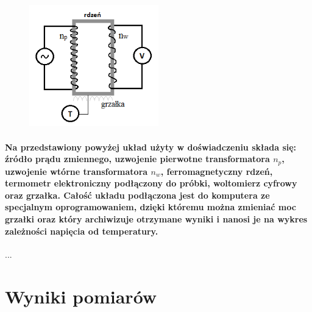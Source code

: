 \documentclass[a4paper,10pt]{article}
\begin{document}
\begin{figure}[H]
\center
\includegraphics[width=0.5\textwidth]{uklad.png}
\end{figure}

\paragraph{Na przedstawiony powyżej układ użyty w doświadczeniu składa się: źródło prądu zmiennego, uzwojenie pierwotne transformatora $n_p$, uzwojenie wtórne transformatora $n_w$, ferromagnetyczny rdzeń, termometr elektroniczny podłączony do próbki, woltomierz cyfrowy oraz grzałka. Całość układu podłączona jest do komputera ze specjalnym oprogramowaniem, dzięki któremu można zmieniać moc grzałki oraz który archiwizuje otrzymane wyniki i nanosi je na wykres zależności napięcia od temperatury.}...

\section{Wyniki pomiarów}
\end{document}
